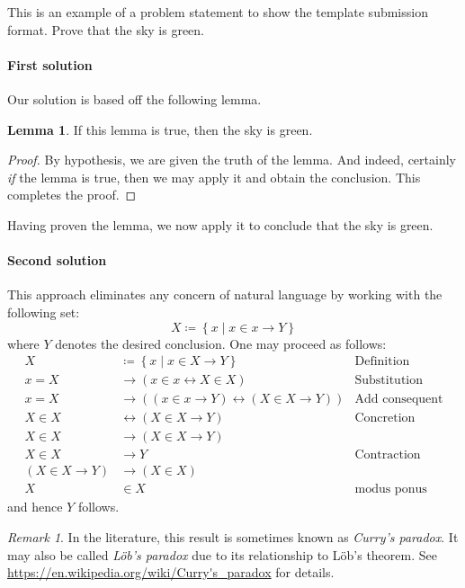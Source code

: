 \documentclass[11pt]{article}
\theoremstyle{definition}
\newtheorem{lemma}[theorem]{Lemma}
\theoremstyle{remark}
\newtheorem*{remark*}{Remark}
\begin{document}
This is an example of a problem statement
to show the template submission format.
Prove that the sky is green.

\newpage %

\paragraph{First solution}
Our solution is based off the following lemma.

\begin{lemma}
	If this lemma is true, then the sky is green.
\end{lemma}
\begin{proof}
	By hypothesis, we are given the truth of the lemma.
	And indeed, certainly \emph{if} the lemma is true,
	then we may apply it and obtain the conclusion.
	This completes the proof.
\end{proof}

Having proven the lemma, we now apply it to conclude that the sky is green.

\paragraph{Second solution}
This approach eliminates any concern of natural language
by working with the following set:
\[ X \coloneqq \left\{ x \mid x \in x \to Y \right\} \]
where $Y$ denotes the desired conclusion.
One may proceed as follows:
\begin{align*}
	X &\coloneqq \left\{ x \mid x \in X \to Y \right\} & \text{Definition} \\
	x=X &\to \left( x \in x \leftrightarrow X \in X \right) & \text{Substitution} \\
	x=X &\to \left( (x \in x \to Y) \leftrightarrow (X \in X \to Y) \right) & \text{Add consequent} \\
	X \in X &\leftrightarrow (X \in X \to Y) & \text{Concretion} \\
	X \in X &\to (X \in X \to Y) & \\
	X \in X &\to Y & \text{Contraction} \\
	(X \in X \to Y) &\to (X \in X) & \\
	X &\in X & \text{modus ponus}
\end{align*}
and hence $Y$ follows.

\begin{remark*}
	In the literature, this result is sometimes known as \emph{Curry's paradox}.
	It may also be called \emph{L\"{o}b's paradox}
	due to its relationship to L\"{o}b's theorem.
	See \url{https://en.wikipedia.org/wiki/Curry's\_paradox} for details.
\end{remark*}
\end{document}
